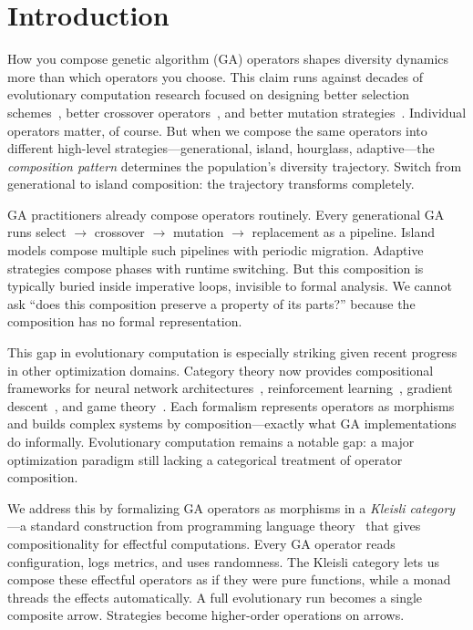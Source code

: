 \documentclass[dvipsnames,format=sigconf,anonymous=false,review=false]{acmart}
\begin{document}
\maketitle

\section{Introduction}

How you compose genetic algorithm (GA) operators shapes diversity dynamics more than which operators you choose. This claim runs against decades of evolutionary computation research focused on designing better selection schemes~\cite{blickle1996comparison}, better crossover operators~\cite{eshelman1993crossover}, and better mutation strategies~\cite{back1996evolutionary}. Individual operators matter, of course. But when we compose the same operators into different high-level strategies---generational, island, hourglass, adaptive---the \emph{composition pattern} determines the population's diversity trajectory. Switch from generational to island composition: the trajectory transforms completely.

GA practitioners already compose operators routinely. Every generational GA runs select $\to$ crossover $\to$ mutation $\to$ replacement as a pipeline. Island models compose multiple such pipelines with periodic migration. Adaptive strategies compose phases with runtime switching. But this composition is typically buried inside imperative loops, invisible to formal analysis. We cannot ask ``does this composition preserve a property of its parts?'' because the composition has no formal representation.

This gap in evolutionary computation is especially striking given recent progress in other optimization domains. Category theory now provides compositional frameworks for neural network architectures~\cite{gavranovic2024categorical}, reinforcement learning~\cite{bakirtzis2024compositional, hedges2024reinforcement}, gradient descent~\cite{hanks2024gradient}, and game theory~\cite{ghani2025approximate}. Each formalism represents operators as morphisms and builds complex systems by composition---exactly what GA implementations do informally. Evolutionary computation remains a notable gap: a major optimization paradigm still lacking a categorical treatment of operator composition.

We address this by formalizing GA operators as morphisms in a \emph{Kleisli category}---a standard construction from programming language theory~\cite{moggi1991notions} that gives compositionality for effectful computations. Every GA operator reads configuration, logs metrics, and uses randomness. The Kleisli category lets us compose these effectful operators as if they were pure functions, while a monad threads the effects automatically. A full evolutionary run becomes a single composite arrow. Strategies become higher-order operations on arrows.
\end{document}
